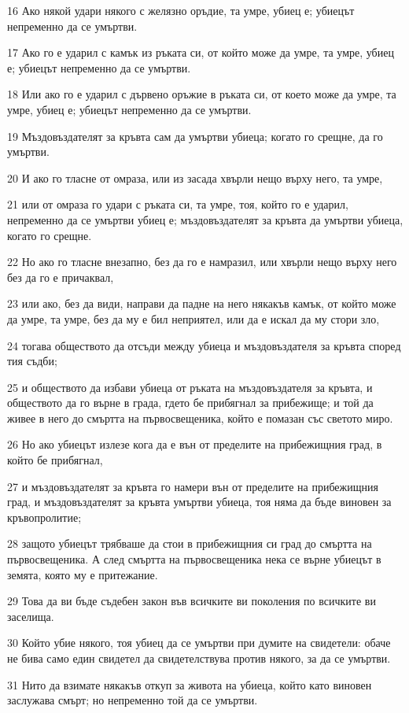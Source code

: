 \par 16 Ако някой удари някого с желязно оръдие, та умре, убиец е; убиецът непременно да се умъртви.
\par 17 Ако го е ударил с камък из ръката си, от който може да умре, та умре, убиец е; убиецът непременно да се умъртви.
\par 18 Или ако го е ударил с дървено оръжие в ръката си, от което може да умре, та умре, убиец е; убиецът непременно да се умъртви.
\par 19 Мъздовъздателят за кръвта сам да умъртви убиеца; когато го срещне, да го умъртви.
\par 20 И ако го тласне от омраза, или из засада хвърли нещо върху него, та умре,
\par 21 или от омраза го удари с ръката си, та умре, тоя, който го е ударил, непременно да се умъртви убиец е; мъздовъздателят за кръвта да умъртви убиеца, когато го срещне.
\par 22 Но ако го тласне внезапно, без да го е намразил, или хвърли нещо върху него без да го е причаквал,
\par 23 или ако, без да види, направи да падне на него някакъв камък, от който може да умре, та умре, без да му е бил неприятел, или да е искал да му стори зло,
\par 24 тогава обществото да отсъди между убиеца и мъздовъздателя за кръвта според тия съдби;
\par 25 и обществото да избави убиеца от ръката на мъздовъздателя за кръвта, и обществото да го върне в града, гдето бе прибягнал за прибежище; и той да живее в него до смъртта на първосвещеника, който е помазан със светото миро.
\par 26 Но ако убиецът излезе кога да е вън от пределите на прибежищния град, в който бе прибягнал,
\par 27 и мъздовъздателят за кръвта го намери вън от пределите на прибежищния град, и мъздовъздателят за кръвта умъртви убиеца, тоя няма да бъде виновен за кръвопролитие;
\par 28 защото убиецът трябваше да стои в прибежищния си град до смъртта на първосвещеника. А след смъртта на първосвещеника нека се върне убиецът в земята, която му е притежание.
\par 29 Това да ви бъде съдебен закон във всичките ви поколения по всичките ви заселища.
\par 30 Който убие някого, тоя убиец да се умъртви при думите на свидетели: обаче не бива само един свидетел да свидетелствува против някого, за да се умъртви.
\par 31 Нито да взимате някакъв откуп за живота на убиеца, който като виновен заслужава смърт; но непременно той да се умъртви.
